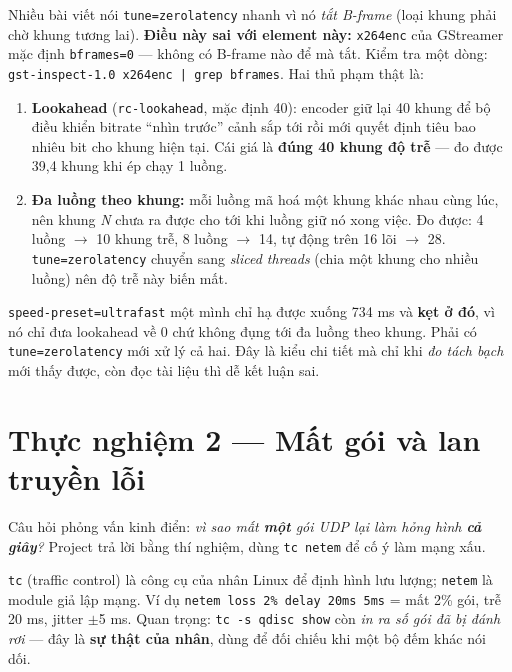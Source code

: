 \documentclass[12pt]{ai_conquer2026}
\begin{document}
Nhiều bài viết nói \texttt{tune=zerolatency} nhanh vì nó \emph{tắt B-frame} (loại
khung phải chờ khung tương lai). \textbf{Điều này sai với element này:}
\texttt{x264enc} của GStreamer mặc định \texttt{bframes=0} --- không có B-frame
nào để mà tắt. Kiểm tra một dòng: \texttt{gst-inspect-1.0 x264enc | grep bframes}.
Hai thủ phạm thật là:

\begin{enumerate}
\item \textbf{Lookahead} (\texttt{rc-lookahead}, mặc định 40): encoder giữ lại 40
      khung để bộ điều khiển bitrate ``nhìn trước'' cảnh sắp tới rồi mới quyết
      định tiêu bao nhiêu bit cho khung hiện tại. Cái giá là \textbf{đúng 40 khung
      độ trễ} --- đo được 39,4 khung khi ép chạy 1 luồng.
\item \textbf{Đa luồng theo khung:} mỗi luồng mã hoá một khung khác nhau cùng
      lúc, nên khung \emph{N} chưa ra được cho tới khi luồng giữ nó xong việc. Đo
      được: 4 luồng $\to$ 10 khung trễ, 8 luồng $\to$ 14, tự động trên 16 lõi
      $\to$ 28. \texttt{tune=zerolatency} chuyển sang \emph{sliced threads} (chia
      một khung cho nhiều luồng) nên độ trễ này biến mất.
\end{enumerate}

\begin{aivncodebox}
\texttt{speed-preset=ultrafast} một mình chỉ hạ được xuống 734 ms và \textbf{kẹt
ở đó}, vì nó chỉ đưa lookahead về 0 chứ không đụng tới đa luồng theo khung. Phải
có \texttt{tune=zerolatency} mới xử lý cả hai. Đây là kiểu chi tiết mà chỉ khi
\emph{đo tách bạch} mới thấy được, còn đọc tài liệu thì dễ kết luận sai.
\end{aivncodebox}

\section{Thực nghiệm 2 --- Mất gói và lan truyền lỗi}
\label{sec:loss}

Câu hỏi phỏng vấn kinh điển: \emph{vì sao mất \textbf{một} gói UDP lại làm hỏng
hình \textbf{cả giây}?} Project trả lời bằng thí nghiệm, dùng \texttt{tc netem}
để cố ý làm mạng xấu.

\begin{aivncodebox}
\texttt{tc} (traffic control) là công cụ của nhân Linux để định hình lưu lượng;
\texttt{netem} là module giả lập mạng. Ví dụ \texttt{netem loss 2\% delay 20ms
5ms} = mất 2\% gói, trễ 20 ms, jitter $\pm$5 ms. Quan trọng: \texttt{tc -s qdisc
show} còn \emph{in ra số gói đã bị đánh rơi} --- đây là \textbf{sự thật của nhân},
dùng để đối chiếu khi một bộ đếm khác nói dối.
\end{aivncodebox}
\end{document}
